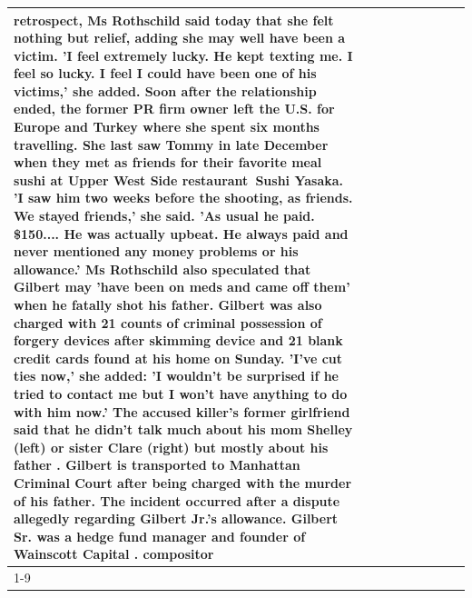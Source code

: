 \begin{table}[H]
\begin{tabular}{lllrlllll}
retrospect, Ms Rothschild said today that she felt nothing but relief, adding she may well have been a victim. 'I feel extremely lucky. He kept texting me. I feel so lucky. I feel I could have been one of his victims,' she added. Soon after the relationship ended, the former PR firm owner left the U.S. for Europe and Turkey where she spent six months  travelling. She last saw Tommy in late December when they met as friends for their favorite meal sushi at Upper West Side restaurant Sushi Yasaka. 'I saw him two weeks before the shooting, as friends. We stayed friends,' she said. 'As usual he paid. \$150.... He was actually upbeat. He always paid and never mentioned any money problems or his allowance.' Ms Rothschild also speculated that Gilbert may 'have been on meds and came off them' when he fatally shot his father. Gilbert was also charged with 21 counts of criminal possession of forgery devices after skimming device and 21 blank credit cards found at his home on Sunday. 'I've cut ties now,' she added: 'I wouldn’t be surprised if he tried to contact me but I won’t have anything to do with him now.' The accused killer's former girlfriend said that he didn't talk much about his mom Shelley (left) or sister Clare (right) but mostly about his father . Gilbert is transported to Manhattan Criminal Court  after being charged with the murder of his father. The incident occurred after a dispute allegedly regarding Gilbert Jr.'s allowance. Gilbert Sr. was a hedge fund manager and founder of Wainscott Capital . compositor \\
\cline{1-9}

\end{tabular}
\end{table}
